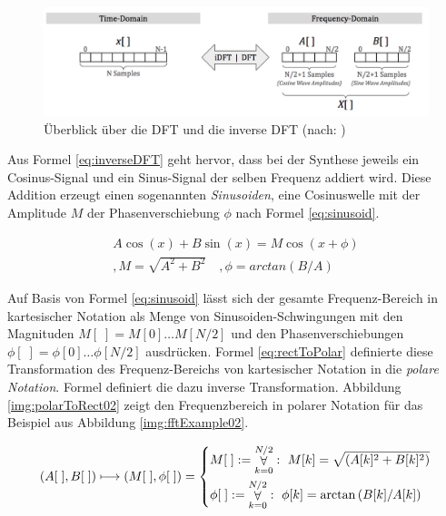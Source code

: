 \begin{figure}[h]
	\centering
	\includegraphics[width=1\textwidth]{bilder/dftOverview04.png}
	\caption{Überblick über die DFT und die inverse DFT (nach: \cite[S. 147]{dspGuide})}
	\label{img:dtOverview}
\end{figure}

Aus Formel \ref{eq:inverseDFT} geht hervor, dass bei der Synthese jeweils ein Cosinus-Signal und ein Sinus-Signal der selben Frequenz addiert wird. Diese Addition erzeugt einen sogenannten \emph{Sinusoiden}, eine Cosinuswelle mit der Amplitude $M$ der Phasenverschiebung $\phi$ nach Formel \ref{eq:sinusoid}.\cite[S. 162]{dspGuide}

\begin{equation}
\begin{split}
A \cos(x) + B \sin(x) = M \cos(x + \phi) \\
,M = \sqrt{A^2 + B^2} \quad, \phi = arctan(B/A)
\end{split}
\label{eq:sinusoid}
\end{equation}

Auf Basis von Formel \ref{eq:sinusoid} lässt sich der gesamte Frequenz-Bereich in kartesischer Notation als Menge von Sinusoiden-Schwingungen mit den Magnituden $M[\;] = M[0] \ldots M[N/2]$ und den Phasenverschiebungen $\phi[\;] = \phi[0] \ldots \phi[N/2]$ ausdrücken. Formel \ref{eq:rectToPolar} definierte diese Transformation des Frequenz-Bereichs von kartesischer Notation in die \emph{polare Notation}. Formel \label{eq:polarToRect} definiert die dazu inverse Transformation. \cite[S. 162]{dspGuide} Abbildung \ref{img:polarToRect02} zeigt den Frequenzbereich in polarer Notation für das Beispiel aus  Abbildung \ref{img:fftExample02}.

\begin{equation}
(A[\;], B[\;]) \longmapsto (M[\;], \phi[\;])  = 
\begin{dcases}
M[\;] := \mathop{\forall}_{k = 0}^{N/2} :\ M[k] = \sqrt{(A[k]^2 + B[k]^2 ) }   \\
 \phi[\;]  := \mathop{\forall}_{k = 0}^{N/2} :\ \phi[k]= \arctan{(B[k] / A[k]) }
\end{dcases}
\label{eq:rectToPolar}
\end{equation}

